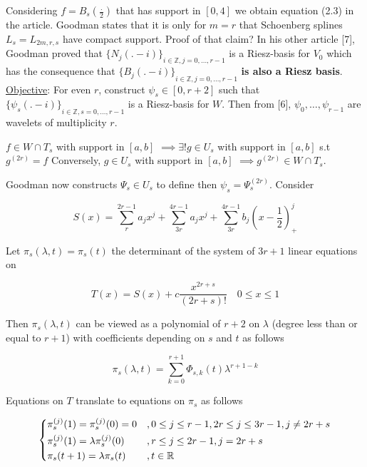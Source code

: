 \documentclass[a4paper, 11pt]{article}
\begin{document}
Considering $f = B_s(\frac{.}{2})$ that has support in $[0,4]$ we obtain equation (2.3) in the article. Goodman states 
that it is only for $m=r$ that Schoenberg splines $L_s = L_{2m,r,s}$ have compact support. Proof of that claim? In his 
other article [7], Goodman proved that ${\{N_j(.-i)\}}_{i \in \mathbb{Z}, j=0, \ldots, r-1}$ is a Riesz-basis for $V_0$ 
which has the consequence that  ${\{B_j(.-i)\}}_{i \in \mathbb{Z}, j=0, \ldots, r-1}$ \textbf{is also a Riesz basis}.  
\\

\underline{Objective}: For even $r$, construct $\psi_s \in [0, r+2]$ such that ${\{\psi_s(.-i)\}}_{i \in \mathbb{Z}, 
s=0, \ldots, r-1}$ is a Riesz-basis for $W$. Then from [6], $\psi_0, \ldots, \psi_{r-1}$ are wavelets of multiplicity 
$r$.

\begin{lem}{2.1}
  $f \in W \cap T_s$ with support in $[a,b]$ $\implies \exists! g \in U_s $ with support in $[a,b]$ s.t $g^{(2r)} = f$
  Conversely, $g \in U_s$ with support in $[a,b]$ $\implies g^{(2r)} \in W \cap T_s$.
\end{lem}

Goodman now constructs $\Psi_s \in U_s$ to define then $\psi_s = \Psi_s^{(2r)}$. Consider

\begin{equation}
  S(x) = \sum_r^{2r-1} a_j x^j + \sum_{3r}^{4r-1} a_j x^j + \sum_{3r}^{4r-1} b_j {(x-\frac{1}{2})}_+^j
\end{equation}

Let $\pi_s(\lambda, t) = \pi_s(t)$ the determinant of the system of $3r+1$ linear equations on 

\begin{equation}
  T(x) = S(x) + c\frac{x^{2r+s}}{(2r+s)!} \quad 0 \leq x \leq 1
\end{equation}

Then $\pi_s(\lambda, t)$ can be viewed as a polynomial of $r+2$ on $\lambda$ (degree less than or equal to $r+1$) with 
coefficients depending on $s$ and $t$ as follows

\begin{equation}
  \pi_s(\lambda, t) = \sum_{k=0}^{r+1} \Phi_{s,k}(t)  \lambda^{r+1-k}
\end{equation}

Equations on $T$ translate to equations on $\pi_{s}$ as follows

\begin{equation}
\begin{dcases}
  \pi_s^{(j)}(1) = \pi_s^{(j)}(0)=0 &, 0 \leq j \leq r-1, 2r \leq j \leq 3r-1, j \neq 2r+s \\
  \pi_s^{(j)}(1) = \lambda \pi_s^{(j)}(0) &, r \leq j \leq 2r-1, j=2r+s \\
  \pi_s(t+1) = \lambda \pi_s(t) &, t \in \mathbb{R}
\end{dcases}
\end{equation}
\end{document}
